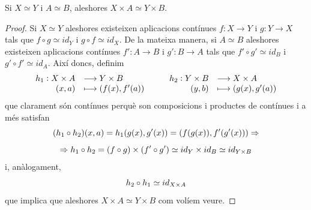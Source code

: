 \documentclass[../main.tex]{subfiles}
\begin{document}
\begin{coro}
[Exercici 3b]\label{exercici1.3.b} Si $X\simeq Y$ i $A\simeq B$, aleshores $X\times A\simeq Y\times B$.
\end{coro}
\begin{proof}
Si $X\simeq Y$ aleshores existeixen aplicacions contínues $f:X\rightarrow Y$ i $g:Y\rightarrow X$ tals que $f\circ g\simeq id_Y$ i $g\circ f\simeq id_X$. De la mateixa manera, si $A\simeq B$ aleshores existeixen aplicacions contínues $f':A\rightarrow B$ i $g':B\rightarrow A$ tals que $f'\circ g'\simeq id_B$ i $g'\circ f'\simeq id_A$. Així doncs, definim
\begin{equation}
    \notag
    \begin{array}{rl}
        h_1:X\times A & \longrightarrow Y\times B \\
        (x,a) & \longmapsto (f(x),f'(a))
    \end{array}
    \qquad 
    \begin{array}{rl}
        h_2:Y\times B & \longrightarrow X\times A \\
        (y,b) & \longmapsto (g(x),g'(a))
    \end{array}
\end{equation}
que clarament són contínues perquè son composicions i productes de contínues i a més satisfan
\begin{equation}
    \notag
    (h_1\circ h_2)(x,a) = h_1(g(x),g'(x)) = (f(g(x)),f'(g'(x))) \Rightarrow 
\end{equation}
\begin{equation}
    \notag
    \Rightarrow h_1\circ h_2 = (f\circ g)\times (f'\circ g')\simeq id_Y\times id_B \simeq id_{Y\times B}
\end{equation}
i, anàlogament,
\begin{equation}
    \notag
    h_2\circ h_1\simeq id_{X\times A}
\end{equation}
que implica que aleshores $X\times A\simeq Y\times B$ com volíem veure.
\end{proof}
\end{document}
